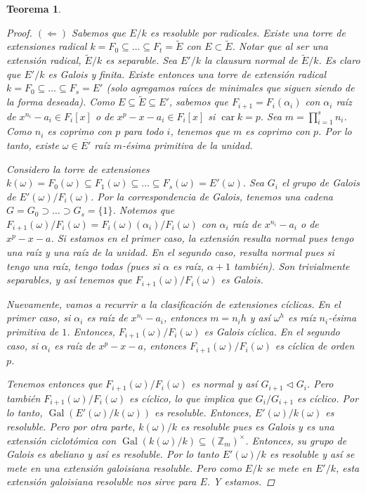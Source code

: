 \documentclass[12pt]{book}
\newtheorem{teo}{Teorema}[section]
\theoremstyle{definition}
\newcommand{\ZZ}{\mathbb{Z}}      %
\DeclareMathOperator{\car}{car}
\DeclareMathOperator{\Gal}{Gal}
\begin{document}
\begin{teo}
\begin{proof}
$(\Longleftarrow)$ Sabemos que $E/k$ es resoluble por radicales. Existe una torre de extensiones radical $k=F_0\subseteq \ldots\subseteq F_t=\widetilde{E}$ con $E\subset\widetilde{E}$. Notar que al ser una extensión radical, $\widetilde{E}/k$ es separable. Sea $E'/k$ la clausura normal de $\widetilde{E}/k$. Es claro que $E'/k$ es Galois y finita. Existe entonces una torre de extensión radical $k=F_0\subseteq\ldots\subseteq F_s=E'$ (solo agregamos raíces de minimales que siguen siendo de la forma deseada). Como $E\subseteq\widetilde{E}\subseteq E'$, sabemos que $F_{i+1}=F_i(\alpha_i)$ con $\alpha_i$ raíz de $x^{n_i}-a_i\in F_i[x]$ o de $x^p - x - a_i\in F_i[x]$ si $\car k=p$. Sea $m=\displaystyle\prod_{i=1}^s n_i$. Como $n_i$ es coprimo con $p$ para todo $i$, tenemos que $m$ es coprimo con $p$. Por lo tanto, existe $\omega\in \overline{E'}$ raíz $m$-ésima primitiva de la unidad.

Considero la torre de extensiones $k(\omega)=F_0(\omega)\subseteq F_1(\omega)\subseteq\ldots\subseteq F_s(\omega)=E'(\omega)$. Sea $G_i$ el grupo de Galois de $E'(\omega)/F_i(\omega)$. Por la correspondencia de Galois, tenemos una cadena $G=G_0\supset\ldots \supset G_s=\{1\}$. Notemos que $F_{i+1}(\omega)/F_i(\omega)=F_i(\omega)(\alpha_{i})/F_i(\omega)$ con $\alpha_i$ raíz de $x^{n_i}-a_i$ o de $x^p - x - a$. Si estamos en el primer caso, la extensión resulta normal pues tengo una raíz y una raíz de la unidad. En el segundo caso, resulta normal pues si tengo una raíz, tengo todas (pues si $\alpha$ es raíz, $\alpha+1$ también). Son trivialmente separables, y así tenemos que $F_{i+1}(\omega)/F_i(\omega)$ es Galois.

Nuevamente, vamos a recurrir a la clasificación de extensiones cíclicas. En el primer caso, si $\alpha_i$ es raíz de $x^{n_i}-a_i$, entonces $m=n_i h$ y así $\omega^h$ es raíz $n_i$-ésima primitiva de $1$. Entonces, $F_{i+1}(\omega)/F_i(\omega)$ es Galois cíclica. En el segundo caso, si $\alpha_i$ es raíz de $x^p - x - a$, entonces $F_{i+1}(\omega)/F_i(\omega)$ es cíclica de orden $p$.

Tenemos entonces que $F_{i+1}(\omega)/F_i(\omega)$ es normal y así $G_{i+1}\triangleleft G_i$. Pero también $F_{i+1}(\omega)/F_i(\omega)$ es cíclico, lo que implica que $G_i/G_{i+1}$ es cíclico. Por lo tanto, $\Gal(E'(\omega)/k(\omega))$ es resoluble. Entonces, $E'(\omega)/k(\omega)$ es resoluble. Pero por otra parte, $k(\omega)/k$ es resoluble pues es Galois y es una extensión ciclotómica con $\Gal(k(\omega)/k)\subseteq (\ZZ_m)^\times$. Entonces, su grupo de Galois es abeliano y así es resoluble. Por lo tanto $E'(\omega)/k$ es resoluble y así se mete en una extensión galoisiana resoluble. Pero como $E/k$ se mete en $E'/k$, esta extensión galoisiana resoluble nos sirve para $E$. Y estamos.
\end{proof}
\end{teo}
\end{document}
